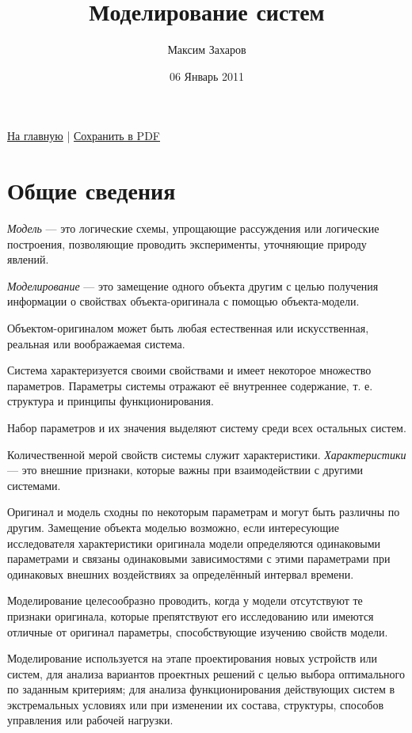 \documentclass[12pt, russian, oneside, article]{ncc}
\begin{document}
\title{Моделирование систем}
\author{Максим Захаров}
\date{06 Январь 2011}
\maketitle

\setcounter{tocdepth}{3}
\tableofcontents
\vspace*{1cm}


\href{file:///home/maxim/Documents/Git/lectures/index.org}{На главную} | \href{file:///home/maxim/Documents/Git/lectures/other/MS_Lectures.pdf}{Сохранить в PDF}

\section{Общие сведения}
\label{sec-1}


\emph{Модель} --- это логические схемы, упрощающие рассуждения или логические построения, позволяющие проводить эксперименты, уточняющие природу явлений.

\emph{Моделирование} --- это замещение одного объекта другим с целью получения информации о свойствах объекта-оригинала с помощью объекта-модели.

Объектом-оригиналом может быть любая естественная или искусственная, реальная или воображаемая система.

Система характеризуется своими свойствами и имеет некоторое множество параметров. Параметры системы отражают её внутреннее содержание, т. е. структура и принципы функционирования.

Набор параметров и их значения выделяют систему среди всех остальных систем.

Количественной мерой свойств системы служит характеристики. \emph{Характеристики} --- это внешние признаки, которые важны при взаимодействии с другими системами.

Оригинал и модель сходны по некоторым параметрам и могут быть различны по другим. Замещение объекта моделью возможно, если интересующие исследователя характеристики оригинала модели определяются одинаковыми параметрами и связаны одинаковыми зависимостями с этими параметрами при одинаковых внешних воздействиях за определённый интервал времени.

Моделирование целесообразно проводить, когда у модели отсутствуют те признаки оригинала, которые препятствуют его исследованию или имеются отличные от оригинал параметры, способствующие изучению свойств модели.

Моделирование используется на этапе проектирования новых устройств или систем, для анализа вариантов проектных решений с целью выбора оптимального по заданным критериям; для анализа функционирования действующих систем в экстремальных условиях или при изменении их состава, структуры, способов управления или рабочей нагрузки.
\end{document}

